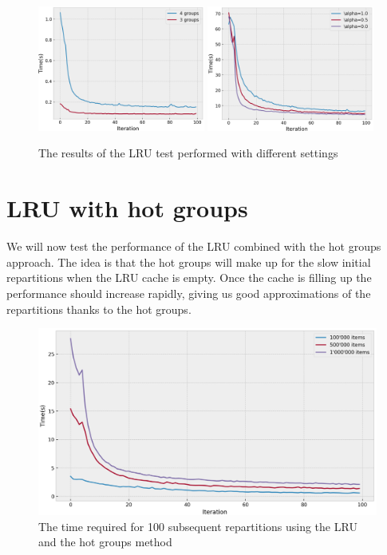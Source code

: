 \begin{figure}[!htb]
  \centering
  \includegraphics[width=0.49\textwidth,height=\textheight,keepaspectratio]{img/LRU_8_groups.png}
  \includegraphics[width=0.49\textwidth,height=\textheight,keepaspectratio]{img/LRU_8_dist.png}
  \caption{ The results of the LRU test performed with different settings }
  \label{fig:LRU_8_extra}
\end{figure}


\section{LRU with hot groups}\label{sec:lru-hot-groups}
We will now test the performance of the LRU combined with the hot groups approach. The idea is that the hot groups will make up for the slow initial repartitions when the LRU cache is empty. Once the cache is filling up the performance should increase rapidly, giving us good approximations of the repartitions thanks to the hot groups. 

\begin{figure}[!htb]
  \centering
  \includegraphics[width=\textwidth,height=\textheight,keepaspectratio]{img/LRU_8_hot.png}
  \caption{The time required for 100 subsequent repartitions using the LRU and the hot groups method}
  \label{fig:LRU_8_hot}
\end{figure}

